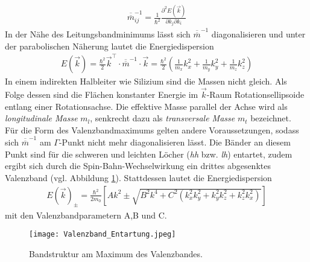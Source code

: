 \begin{align}
\overline{\overline{m}}_{ij}^{-1}=\frac{1}{\hbar^2}\frac{\partial^2 E(\vec{k})}{\partial k_j \partial k_i}
\end{align}
In der Nähe des Leitungsbandminimums lässt sich $\overline{\overline{m}}^{-1}$ diagonalisieren und unter der parabolischen Näherung lautet die Energiedispersion
\begin{align}
E(\vec{k})=\frac{\hbar^2}{2}\vec{k}^\intercal\cdot \overline{\overline{m}}^{-1}\cdot \vec{k}=\frac{\hbar^2}{2}\left(\frac{1}{m_x}k_x^2+\frac{1}{m_y}k_y^2+\frac{1}{m_z}k_z^2\right)
\end{align}
In einem indirekten Halbleiter wie Silizium sind die Massen nicht gleich. Als Folge dessen sind die Flächen konstanter Energie im $\vec{k}$-Raum Rotationsellipsoide entlang einer Rotationsachse. Die effektive Masse parallel der Achse wird als \emph{longitudinale Masse} $m_l$, senkrecht dazu als \emph{transversale Masse} $m_t$ bezeichnet.\\
Für die Form des Valenzbandmaximums gelten andere Voraussetzungen, sodass sich $\overline{\overline{m}}^{-1}$ am $\Gamma$-Punkt nicht mehr diagonalisieren lässt. Die Bänder an diesem Punkt sind für die schweren und leichten Löcher (\emph{hh} bzw. \emph{lh}) entartet, zudem ergibt sich durch die Spin-Bahn-Wechselwirkung ein drittes abgesenktes Valenzband (vgl. Abbildung \ref{fig:valence_degen}).
Stattdessen lautet die Energiedispersion
\begin{align}
E(\vec{k})_{\pm}=\frac{\hbar^2}{2m_0}\left[Ak^2\pm \sqrt{B^2k^4+C^2(k_x^2 k_y^2+k_y^2 k_z^2+k_z^2 k_x^2)}\right]
\end{align}
mit den Valenzbandparametern A,B und C.
\begin{figure}[h]
\begin{center}
\texttt{[image: Valenzband\_Entartung.jpeg]}
\caption{Bandstruktur am Maximum des Valenzbandes.}
\label{fig:valence_degen}
\end{center}
\end{figure}
